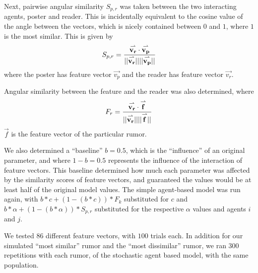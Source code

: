 Next, pairwise angular similarity $ S_{p,r} $ was taken between the two interacting agents, poster and reader. This is incidentally equivalent to the cosine value of the angle between the vectors, which is nicely contained between $ 0 $ and $ 1 $, where $ 1 $ is the most similar. This is given by
$$ S_{p,r} = \frac{\overset{\rightharpoonup}{\mathbf{v_r}}\cdot\overset{\rightharpoonup}{\mathbf{v_p}}}{\lvert\lvert \overset{\rightharpoonup}{\mathbf{v_r}} \rvert\rvert \lvert\lvert \overset{\rightharpoonup}{\mathbf{v_p}} \rvert\rvert} $$ where the poster has feature vector $ \vec{v_p} $ and the reader has feature vector $ \vec{v_r} $.

Angular similarity between the feature and the reader was also determined, where $$ F_r = \frac{\overset{\rightharpoonup}{\mathbf{v_r}}\cdot\overset{\rightharpoonup}{\mathbf{f}}}{\lvert\lvert \overset{\rightharpoonup}{\mathbf{v_r}} \rvert\rvert \lvert\lvert \overset{\rightharpoonup}{\mathbf{f}} \rvert\rvert} $$ $ \vec{f} $ is the feature vector of the particular rumor.

We also determined a ``baseline'' $ b = 0.5 $, which is the ``influence'' of an original parameter, and where $ 1 - b = 0.5 $ represents the influence of the interaction of feature vectors.
This baseline determined how much each parameter was affected by the similarity scores of feature vectors, and guaranteed the values would be at least half of the original model values.
The simple agent-based model was run again, with $ b*c + (1-(b*c))*F_k $ substituted for $ c $ and $ b*\alpha + (1-(b*\alpha))*S_{p,r} $ substituted for the respective $ \alpha $ values and agents $ i $ and $ j $.

We tested $ 86 $ different feature vectors, with $ 100 $ trials each.
In addition for our simulated ``most similar'' rumor and the ``most dissimilar'' rumor, we ran $ 300 $ repetitions with each rumor, of the stochastic agent based model, with the same population.
